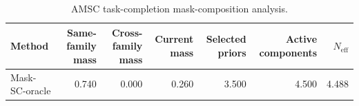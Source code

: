 \begin{table}[ht]
    \caption{AMSC task-completion mask-composition analysis.}
    \label{tbl:amsc_composition}
    \centering
    \scriptsize
    \begin{tabular}{lrrrrrr}
    \toprule
Method & Same-family mass & Cross-family mass & Current mass & Selected priors & Active components & $N_{\mathrm{eff}}$ \\
    \midrule
Mask-SC-oracle & 0.740 & 0.000 & 0.260 & 3.500 & 4.500 & 4.488 \\
    \bottomrule
    \end{tabular}
\end{table}
